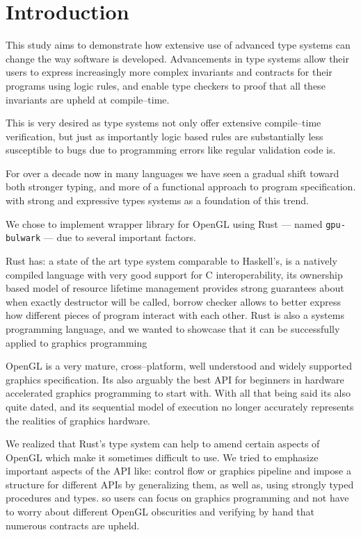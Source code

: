 \chapter*{Introduction}

This study aims to demonstrate how extensive use of advanced type systems can change the way software is developed.
Advancements in type systems allow their users to express increasingly more complex invariants and contracts for their programs using logic rules, 
and enable type checkers to proof that all these invariants are upheld at compile--time.

This is very desired as type systems not only offer extensive compile--time verification, but just as importantly logic based rules are substantially less susceptible to bugs
due to programming errors like regular validation code is.

For over a decade now in many languages we have seen a gradual shift toward both stronger typing, and more of a functional approach to program specification.
with strong and expressive types systems as a foundation of this trend.

We chose to implement wrapper library for OpenGL using Rust --- named \texttt{gpu-bulwark} --- due to several important factors.

Rust has: a state of the art type system comparable to Haskell's, 
is a natively compiled language with very good support for C interoperability,
its ownership based model of resource lifetime management provides strong guarantees about when exactly destructor will be called,
borrow checker allows to better express how different pieces of program interact with each other.
Rust is also a systems programming language, and we wanted to showcase that it can be successfully applied to graphics programming \cite{rustpage}

OpenGL is a very mature, cross--platform, well understood and widely supported graphics specification.
Its also arguably the best API for beginners in hardware accelerated graphics programming to start with.
With all that being said its also quite dated, and its sequential model of execution no longer accurately represents the realities of graphics hardware.

We realized that Rust's type system can help to amend certain aspects of OpenGL which make it sometimes difficult to use.
We tried to emphasize important aspects of the API like: control flow or graphics pipeline and 
impose a structure for different APIs by generalizing them, as well as, using strongly typed procedures and types.
so users can focus on graphics programming and not have to worry about different OpenGL obscurities and verifying by hand that 
numerous contracts are upheld.
